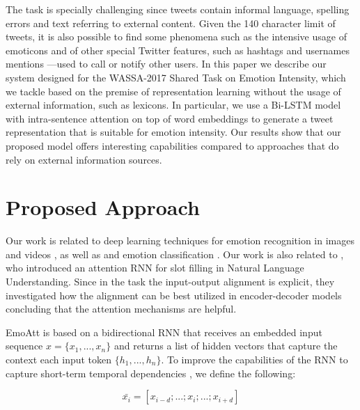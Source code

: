 \documentclass[11pt,letterpaper]{article}
\begin{document}
The task is specially challenging since tweets contain informal language, spelling errors and text referring to external content. Given the 140 character limit of tweets, it is also possible to find some phenomena such as the intensive usage of emoticons and of other special Twitter features, such as hashtags and usernames mentions ---used to call or notify other users. In this paper we describe our system designed for the WASSA-2017 Shared Task on Emotion Intensity, which we tackle based on the premise of representation learning without the usage of external information, such as lexicons. In particular, we use a Bi-LSTM model with intra-sentence attention on top of word embeddings to generate a tweet representation that is suitable for emotion intensity. Our results show that our proposed model offers interesting capabilities compared to approaches that do rely on external information sources.


\section{Proposed Approach}

Our work is related to deep learning techniques for emotion recognition in images \cite{Dhall_2015} and videos \cite{EbrahimiKahou_2015}, as well as and emotion classification \cite{lakomkin_2017}. Our work is also related to , who introduced an attention RNN for slot filling in Natural Language Understanding. Since in the task the input-output alignment is explicit, they investigated how the alignment can be best utilized in encoder-decoder models concluding that the attention mechanisms are helpful. 

EmoAtt is based on a bidirectional RNN that receives an embedded input sequence $x = \{ x_1, ..., x_n \}$ and returns a list of hidden vectors that capture the context each input token $\{ h_1, ..., h_n \}$. To improve the capabilities of the RNN to capture short-term temporal dependencies \cite{mesnil_investigation_2013}, we define the following:

\begin{equation}
\bar{x_i} = [ x_{i-d}; ...; x_{i}; ...; x_{i+d} ]
\end{equation}
\end{document}
